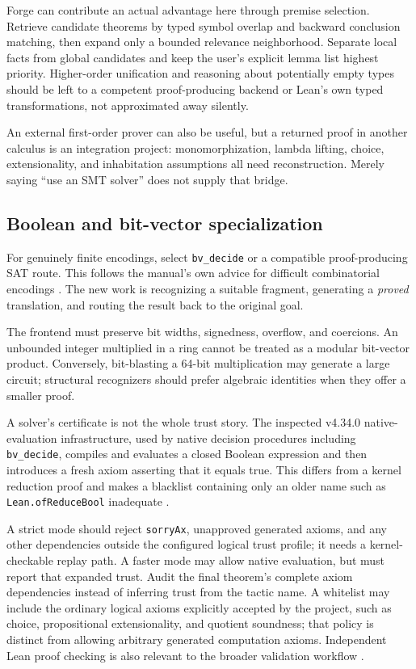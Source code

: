 \documentclass[11pt,a4paper]{article}
\newcommand{\code}[1]{\texttt{#1}}
\begin{document}
Forge can contribute an actual advantage here through premise selection. Retrieve candidate theorems by typed symbol overlap and backward conclusion matching, then expand only a bounded relevance neighborhood. Separate local facts from global candidates and keep the user's explicit lemma list highest priority. Higher-order unification and reasoning about potentially empty types should be left to a competent proof-producing backend or Lean's own typed transformations, not approximated away silently.

An external first-order prover can also be useful, but a returned proof in another calculus is an integration project: monomorphization, lambda lifting, choice, extensionality, and inhabitation assumptions all need reconstruction. Merely saying ``use an SMT solver'' does not supply that bridge.

\subsection{Boolean and bit-vector specialization}
For genuinely finite encodings, select \code{bv\_decide} or a compatible proof-producing SAT route. This follows the manual's own advice for difficult combinatorial encodings \cite{grindmanual}. The new work is recognizing a suitable fragment, generating a \emph{proved} translation, and routing the result back to the original goal.

The frontend must preserve bit widths, signedness, overflow, and coercions. An unbounded integer multiplied in a ring cannot be treated as a modular bit-vector product. Conversely, bit-blasting a 64-bit multiplication may generate a large circuit; structural recognizers should prefer algebraic identities when they offer a smaller proof.

A solver's certificate is not the whole trust story. The inspected v4.34.0 native-evaluation infrastructure, used by native decision procedures including \code{bv\_decide}, compiles and evaluates a closed Boolean expression and then introduces a fresh axiom asserting that it equals true. This differs from a kernel reduction proof and makes a blacklist containing only an older name such as \code{Lean.ofReduceBool} inadequate \cite{nativeinfra}.

A strict mode should reject \code{sorryAx}, unapproved generated axioms, and any other dependencies outside the configured logical trust profile; it needs a kernel-checkable replay path. A faster mode may allow native evaluation, but must report that expanded trust. Audit the final theorem's complete axiom dependencies instead of inferring trust from the tactic name. A whitelist may include the ordinary logical axioms explicitly accepted by the project, such as choice, propositional extensionality, and quotient soundness; that policy is distinct from allowing arbitrary generated computation axioms. Independent Lean proof checking is also relevant to the broader validation workflow \cite{lean4lean}.
\end{document}
